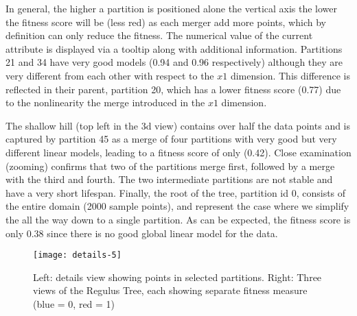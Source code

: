 In general, the higher a partition is positioned alone the vertical axis the lower the fitness score will be (less red) as each merger add more points, which by definition can only reduce the fitness. The numerical value of the current attribute is displayed via a tooltip along with additional information. Partitions 21 and 34 have very good models (0.94 and 0.96 respectively) although they are very different from each other with respect to the $x1$ dimension. This difference is reflected in their parent, partition 20, which has a lower fitness score (0.77) due to the nonlinearity the merge introduced in the $x1$ dimension. 

The shallow hill (top left in the 3d view) contains over half the data points and is captured by partition 45 as a merge of four partitions with very good but very different linear models, leading to a fitness score of only (0.42). Close examination (zooming) confirms that two of the partitions merge first, followed by a merge with the third and fourth. The two intermediate partitions are not stable and have a very short lifespan. Finally, the root of the tree, partition id 0, consists of the entire domain (2000 sample points), and represent the case where we simplify the \MSC all the way down to a single partition. As can be expected, the fitness score is only 0.38 since there is no good global linear model for the data. 


\begin{figure}[bt]
    \begin{center}
     \texttt{[image: details-5]}
    \caption{Left: details view showing points in selected partitions. Right: Three views of the Regulus Tree, each showing separate fitness measure (blue = 0, red = 1)}
    \label{fig:fitness}
    \end{center}
\end{figure}

